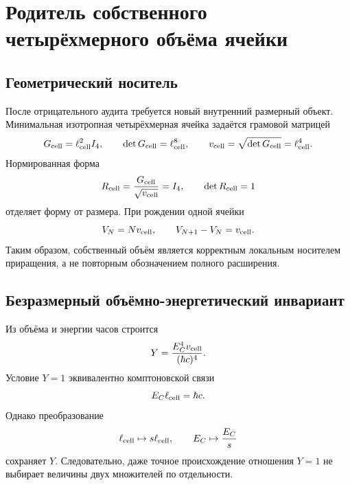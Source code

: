 \chapter{Родитель собственного четырёхмерного объёма ячейки}
\label{ch:v10-cell-birth-intrinsic-four-volume-parent-origin}

\section{Геометрический носитель}

После отрицательного аудита требуется новый внутренний размерный объект.
Минимальная изотропная четырёхмерная ячейка задаётся грамовой матрицей
\begin{equation}
 G_{\rm cell}=\ell_{\rm cell}^2I_4,
 \qquad \det G_{\rm cell}=\ell_{\rm cell}^8,
 \qquad v_{\rm cell}=\sqrt{\det G_{\rm cell}}=\ell_{\rm cell}^4.
 \label{eq:v10-cell-four-volume}
\end{equation}
Нормированная форма
\begin{equation}
 R_{\rm cell}=\frac{G_{\rm cell}}{\sqrt{v_{\rm cell}}}=I_4,
 \qquad \det R_{\rm cell}=1
 \label{eq:v10-cell-unimodular-shape}
\end{equation}
отделяет форму от размера. При рождении одной ячейки
\begin{equation}
 V_N=Nv_{\rm cell},
 \qquad V_{N+1}-V_N=v_{\rm cell}.
 \label{eq:v10-cell-volume-birth-law}
\end{equation}
Таким образом, собственный объём является корректным локальным носителем
приращения, а не повторным обозначением полного расширения.

\section{Безразмерный объёмно-энергетический инвариант}

Из объёма и энергии часов строится
\begin{equation}
 Y=\frac{E_C^4v_{\rm cell}}{(\hbar c)^4}.
 \label{eq:v10-cell-volume-energy-invariant}
\end{equation}
Условие $Y=1$ эквивалентно комптоновской связи
\begin{equation}
 E_C\ell_{\rm cell}=\hbar c.
 \label{eq:v10-cell-compton-relation}
\end{equation}
Однако преобразование
\begin{equation}
 \ell_{\rm cell}\mapsto s\ell_{\rm cell},
 \qquad E_C\mapsto\frac{E_C}{s}
 \label{eq:v10-cell-volume-energy-orbit}
\end{equation}
сохраняет $Y$. Следовательно, даже точное происхождение отношения $Y=1$
не выбирает величины двух множителей по отдельности.

